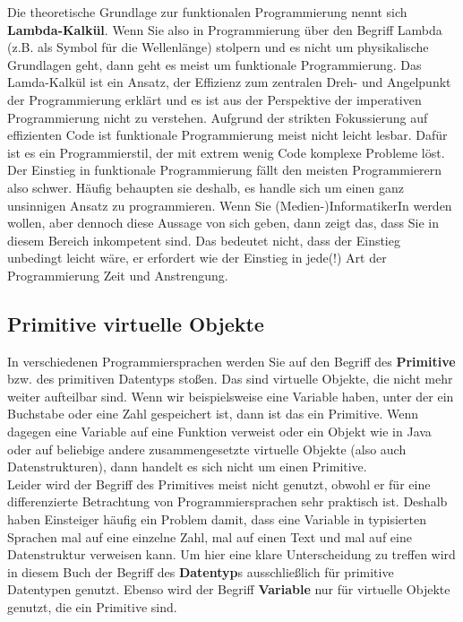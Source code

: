 Die theoretische Grundlage zur funktionalen Programmierung nennt sich \textbf{Lambda-Kalkül}. Wenn Sie also in Programmierung über den Begriff Lambda (z.B. als Symbol für die Wellenlänge) stolpern und es nicht um physikalische Grundlagen geht, dann geht es meist um funktionale Programmierung. Das Lamda-Kalkül ist ein Ansatz, der Effizienz zum zentralen Dreh- und Angelpunkt der Programmierung erklärt und es ist aus der Perspektive der imperativen Programmierung nicht zu verstehen. Aufgrund der strikten Fokussierung auf effizienten Code ist funktionale Programmierung meist nicht leicht lesbar. Dafür ist es ein Programmierstil, der mit extrem wenig Code komplexe Probleme löst. Der Einstieg in funktionale Programmierung fällt den meisten Programmierern also schwer. Häufig behaupten sie deshalb, es handle sich um einen ganz unsinnigen Ansatz zu programmieren. Wenn Sie (Medien-)InformatikerIn werden wollen, aber dennoch diese Aussage von sich geben, dann zeigt das, dass Sie in diesem Bereich inkompetent sind. Das bedeutet nicht, dass der Einstieg unbedingt leicht wäre, er erfordert wie der Einstieg in jede(!) Art der Programmierung Zeit und Anstrengung.

\subsection{Primitive virtuelle Objekte}

In verschiedenen Programmiersprachen werden Sie auf den Begriff des \textbf{Primitive} bzw. des primitiven Datentyps stoßen. Das sind virtuelle Objekte, die nicht mehr weiter aufteilbar sind. Wenn wir beispielsweise eine Variable haben, unter der ein Buchstabe oder eine Zahl gespeichert ist, dann ist das ein Primitive. Wenn dagegen eine Variable auf eine Funktion verweist oder ein Objekt wie in Java oder auf beliebige andere zusammengesetzte virtuelle Objekte (also auch Datenstrukturen), dann handelt es sich nicht um einen Primitive.\\

Leider wird der Begriff des Primitives meist nicht genutzt, obwohl er für eine differenzierte Betrachtung von Programmiersprachen sehr praktisch ist. Deshalb haben Einsteiger häufig ein Problem damit, dass eine Variable in typisierten Sprachen mal auf eine einzelne Zahl, mal auf einen Text und mal auf eine Datenstruktur verweisen kann. Um hier eine klare Unterscheidung zu treffen wird in diesem Buch der Begriff des \textbf{Datentyp}s ausschließlich für primitive Datentypen genutzt. Ebenso wird der Begriff \textbf{Variable} nur für virtuelle Objekte genutzt, die ein Primitive sind.

